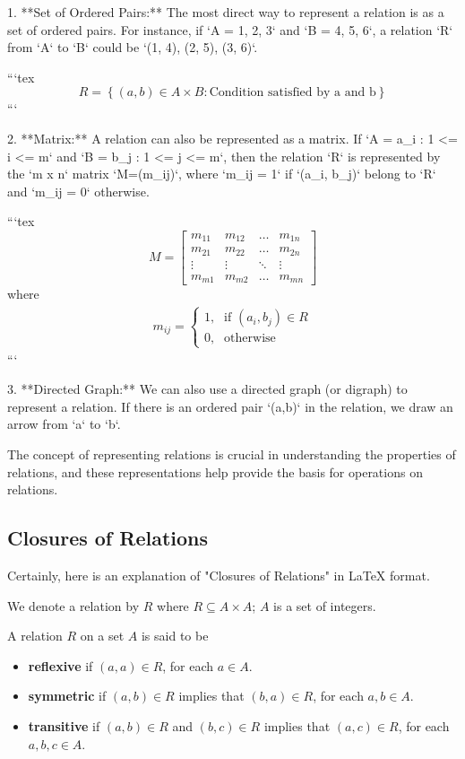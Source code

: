 1. **Set of Ordered Pairs:** The most direct way to represent a relation is as a set of ordered pairs. For instance, if `A = {1, 2, 3}` and `B = {4, 5, 6}`, a relation `R` from `A` to `B` could be `{(1, 4), (2, 5), (3, 6)}`.

```tex
\[
R=\left\{  (a,b) \in A \times B : \text{Condition satisfied by a and b} \right\}
\]
```

2. **Matrix:** A relation can also be represented as a matrix. If `A = {a_i : 1 <= i <= m}` and `B = {b_j : 1 <= j <= m}`, then the relation `R` is represented by the `m x n` matrix `M=(m_{ij})`, where `m_{ij} = 1` if `(a_i, b_j)` belong to `R` and `m_{ij} = 0` otherwise.

```tex
\[
M = \begin{bmatrix}
m_{11} & m_{12} & \dots & m_{1n} \\
m_{21} & m_{22} & \dots & m_{2n} \\
\vdots & \vdots & \ddots & \vdots \\
m_{m1} & m_{m2} & \dots & m_{mn}
\end{bmatrix}
\]
where \begin{align*}
m_{ij} =
    \begin{cases}
      \text{1,} & \text{if }(a_i,b_j) \in R\\
      \text{0,} & \text{otherwise}
    \end{cases}
\end{align*}
```

3. **Directed Graph:** We can also use a directed graph (or digraph) to represent a relation. If there is an ordered pair `(a,b)` in the relation, we draw an arrow from `a` to `b`.

The concept of representing relations is crucial in understanding the properties of relations, and these representations help provide the basis for operations on relations.

\subsection{Closures of Relations}
Certainly, here is an explanation of "Closures of Relations" in LaTeX format. 

We denote a relation by $R$ where $R \subseteq A \times A$; $A$ is a set of integers.

A relation $R$ on a set $A$ is said to be 
\begin{itemize}
\item \textbf{reflexive} if $(a,a) \in R$, for each $a \in A$.
\item \textbf{symmetric} if $(a,b) \in R$ implies that $(b,a) \in R$, for each $a,b \in A$.
\item \textbf{transitive} if $(a,b) \in R$ and $(b,c) \in R$ implies that $(a,c) \in R$,  for each $a, b, c \in A$.
\end{itemize}

